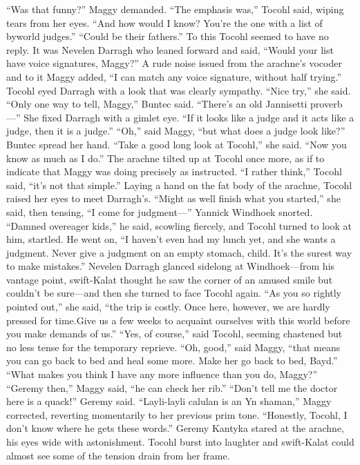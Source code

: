 \documentclass[9pt]{article}
\begin{document}
“Was that funny?” Maggy demanded.
“The emphasis was,” Tocohl said, wiping tears from her eyes. “And how would I know? You’re the
one with a list of byworld judges.”
“Could be their fathers.”
To this Tocohl seemed to have no reply. It was Nevelen Darragh who leaned forward and said,
“Would your list have voice signatures, Maggy?”
A rude noise issued from the arachne’s vocoder and to it Maggy added, “I can match any voice
signature, without half trying.”
Tocohl eyed Darragh with a look that was clearly sympathy. “Nice try,” she said.
“Only one way to tell, Maggy,” Buntec said. “There’s an old Jannisetti proverb—” She fixed Darragh
with a gimlet eye. “If it looks like a judge and it acts like a judge, then it is a judge.”
“Oh,” said Maggy, “but what does a judge look like?”
Buntec spread her hand. “Take a good long look at Tocohl,” she said. “Now you know as much as I
do.”
The arachne tilted up at Tocohl once more, as if to indicate that Maggy was doing precisely as
instructed. “I rather think,” Tocohl said, “it’s not that simple.” Laying a hand on the fat body of the
arachne, Tocohl raised her eyes to meet Darragh’s. “Might as well finish what you started,” she said, then
tensing, “I come for judgment—”
Yannick Windhoek snorted. “Damned overeager kids,” he said, scowling fiercely, and Tocohl turned
to look at him, startled. He went on, “I haven’t even had my lunch yet, and she wants a judgment. Never
give a judgment on an empty stomach, child. It’s the surest way to make mistakes.”
Nevelen Darragh glanced sidelong at Windhoek—from his vantage point, swift-Kalat thought he saw
the corner of an amused smile but couldn’t be sure—and then she turned to face Tocohl again. “As you
so rightly pointed out,” she said, “the trip is costly. Once here, however, we are hardly pressed for time.Give us a few weeks to acquaint ourselves with this world before you make demands of us.”
“Yes, of course,” said Tocohl, seeming chastened but no less tense for the temporary reprieve.
“Oh, good,” said Maggy, “that means you can go back to bed and heal some more. Make her go
back to bed, Bayd.”
“What makes you think I have any more influence than you do, Maggy?”
“Geremy then,” Maggy said, “he can check her rib.”
“Don’t tell me the doctor here is a quack!” Geremy said.
“Layli-layli calulan is an Yn shaman,” Maggy corrected, reverting momentarily to her previous prim
tone. “Honestly, Tocohl, I don’t know where he gets these words.”
Geremy Kantyka stared at the arachne, his eyes wide with astonishment. Tocohl burst into laughter
and swift-Kalat could almost see some of the tension drain from her frame.
\end{document}
